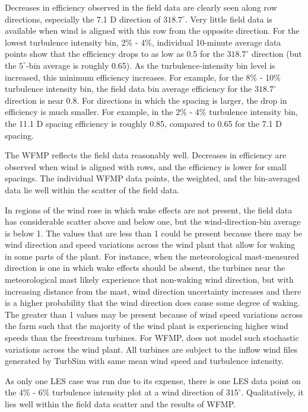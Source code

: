 \documentclass{umthesis}
\begin{document}
Decreases in efficiency observed in the field data are clearly seen along row directions, especially the 7.1 D direction of $318.7^\circ$. Very little field data is available when wind is aligned with this row from the opposite direction. For the lowest turbulence intensity bin, 2\% - 4\%, individual 10-minute average data points show that the efficiency drops to as low as 0.5 for the $318.7^\circ$ direction (but the $5^\circ$-bin average is roughly 0.65). As the turbulence-intensity bin level is increased, this minimum efficiency increases. For example, for the 8\% - 10\% turbulence intensity bin, the field data bin average efficiency for the $318.7^\circ$ direction is near 0.8. For directions in which the spacing is larger, the drop in efficiency is much smaller. For example, in the 2\% - 4\% turbulence intensity bin, the 11.1 D spacing efficiency is roughly 0.85, compared to 0.65 for the 7.1 D spacing.

The WFMP reflects the field data reasonably well. Decreases in efficiency are observed when wind is aligned with rows, and the efficiency is lower for small spacings. The individual WFMP data points, the weighted, and the bin-averaged data lie well within the scatter of the field data.

In regions of the wind rose in which wake effects are not present, the field data has considerable scatter above and below one, but the wind-direction-bin average is below 1. The values that are less than 1 could be present because there may be wind direction and speed variations across the wind plant that allow for waking in some parts of the plant. For instance, when the meteorological mast-measured direction is one in which wake effects should be absent, the turbines near the meteorological mast likely experience that non-waking wind direction, but with increasing distance from the mast, wind direction uncertainty increases and there is a higher probability that the wind direction does cause some degree of waking. The greater than 1 values may be present because of wind speed variations across the farm such that the majority of the wind plant is experiencing higher wind speeds than the freestream turbines. For WFMP, does not model such stochastic variations across the wind plant. All turbines are subject to the inflow wind files generated by TurbSim with same mean wind speed and turbulence intensity.

As only one LES case was run due to its expense, there is one LES data point on the 4\% - 6\% turbulence intensity plot at a wind direction of $315^\circ$. Qualitatively, it lies well within the field data scatter and the results of WFMP.
\end{document}
